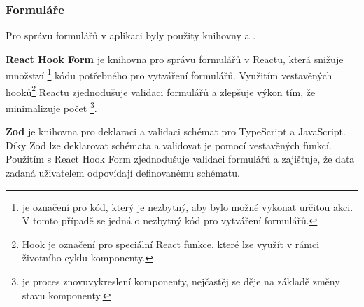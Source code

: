 \subsubsection{Formuláře}
\label{subsubsec:implementace-technologie-ostatni-formulare}
Pro správu formulářů v aplikaci byly použity knihovny  a .

\textbf{React Hook Form} je knihovna pro správu formulářů v Reactu, která snižuje množství \footnote{ je označení pro kód, který je nezbytný, aby bylo možné vykonat určitou akci. V tomto případě se jedná o nezbytný kód pro vytváření formulářů.} kódu potřebného pro vytváření formulářů.
Využitím vestavěných hooků\footnote{Hook je označení pro speciální React funkce, které lze využít v rámci životního cyklu komponenty\cite{fos_projects_react}.} Reactu zjednodušuje validaci formulářů a zlepšuje výkon tím, že minimalizuje počet \footnote{ je proces znovuvykreslení komponenty, nejčastěj se děje na základě změny stavu komponenty.}.

\textbf{Zod} je knihovna pro deklaraci a validaci schémat pro TypeScript a JavaScript.
Díky Zod lze deklarovat schémata a validovat je pomocí vestavěných funkcí.
Použitím s React Hook Form zjednodušuje validaci formulářů a zajišťuje, že data zadaná uživatelem odpovídají definovanému schématu.
